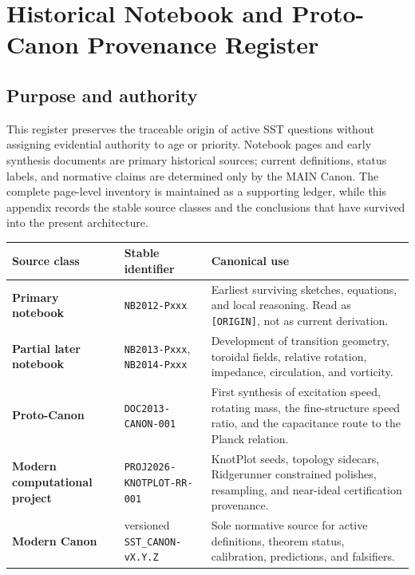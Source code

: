 \documentclass[11pt]{article}
\theoremstyle{definition}
\theoremstyle{plain}
\theoremstyle{remark}
\begin{document}
    \section{Historical Notebook and Proto-Canon Provenance Register}
    \label{sec:appendix_historical_provenance}

    \subsection{Purpose and authority}
    This register preserves the traceable origin of active SST questions without
    assigning evidential authority to age or priority.  Notebook pages and early
    synthesis documents are primary historical sources; current definitions,
    status labels, and normative claims are determined only by the MAIN Canon.
    The complete page-level inventory is maintained as a supporting ledger, while
    this appendix records the stable source classes and the conclusions that have
    survived into the present architecture.

    \begin{center}
    \begin{tabularx}{0.96\textwidth}{@{}>{\bfseries}p{}p{}X@{}}
    \toprule
    Source class & Stable identifier & Canonical use \\
    \midrule
    Primary notebook & \texttt{NB2012-Pxxx} & Earliest surviving sketches, equations, and local reasoning. Read as \texttt{[ORIGIN]}, not as current derivation. \\
    Partial later notebook & \texttt{NB2013-Pxxx}, \texttt{NB2014-Pxxx} & Development of transition geometry, toroidal fields, relative rotation, impedance, circulation, and vorticity. \\
    Proto-Canon & \texttt{DOC2013-CANON-001} & First synthesis of excitation speed, rotating mass, the fine-structure speed ratio, and the capacitance route to the Planck relation. \\
    Modern computational project & \texttt{PROJ2026-KNOTPLOT-RR-001} & KnotPlot seeds, topology sidecars, Ridgerunner constrained polishes, resampling, and near-ideal certification provenance. \\
    Modern Canon & versioned \texttt{SST\_CANON-vX.Y.Z} & Sole normative source for active definitions, theorem status, calibration, predictions, and falsifiers. \\
    \bottomrule
    \end{tabularx}
    \end{center}
\end{document}
